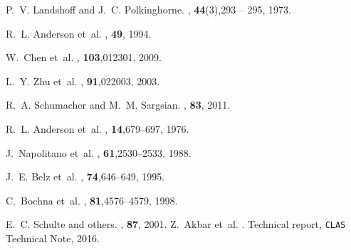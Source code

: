 \documentclass[aps,prc,onecolumn,floatfix,showpacs,preprintnumbers,amsmath,amssymb,superscriptaddress]{revtex4-1}
\begin{document}
\begin{thebibliography}{99}
P.~V. Landshoff and J.~C. Polkinghorne.
, \textbf{44}(3),293 -- 295, 1973.

R.~L. Anderson et~al.
, \textbf{49}, 1994.

W.~Chen et~al.
, \textbf{103},012301, 2009.

L.~Y. Zhu et~al.
, \textbf{91},022003, 2003.

R.~A. Schumacher and M.~M. Sargsian.
, \textbf{83}, 2011.

R.~L. Anderson et~al.
, \textbf{14},679--697, 1976.

J.~Napolitano et~al.
, \textbf{61},2530--2533, 1988.

J.~E. Belz et~al.
, \textbf{74},646--649, 1995.

C.~Bochna et~al.
, \textbf{81},4576--4579, 1998.

E.~C. Schulte and others.
, \textbf{87}, 2001.
Z.~Akbar et~al.
.
\newblock Technical report, \texttt{CLAS} Technical Note, 2016.


\end{thebibliography}
\end{document}
